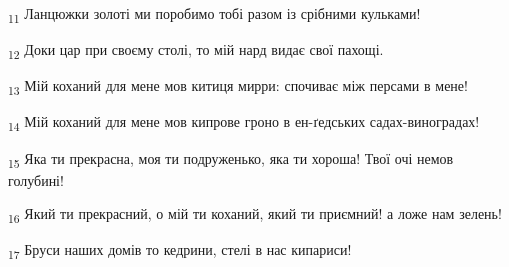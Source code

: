 \begin{tcolorbox}
\textsubscript{11} Ланцюжки золоті ми поробимо тобі разом із срібними кульками!
\end{tcolorbox}
\begin{tcolorbox}
\textsubscript{12} Доки цар при своєму столі, то мій нард видає свої пахощі.
\end{tcolorbox}
\begin{tcolorbox}
\textsubscript{13} Мій коханий для мене мов китиця мирри: спочиває між персами в мене!
\end{tcolorbox}
\begin{tcolorbox}
\textsubscript{14} Мій коханий для мене мов кипрове гроно в ен-ґедських садах-виноградах!
\end{tcolorbox}
\begin{tcolorbox}
\textsubscript{15} Яка ти прекрасна, моя ти подруженько, яка ти хороша! Твої очі немов голубині!
\end{tcolorbox}
\begin{tcolorbox}
\textsubscript{16} Який ти прекрасний, о мій ти коханий, який ти приємний! а ложе нам зелень!
\end{tcolorbox}
\begin{tcolorbox}
\textsubscript{17} Бруси наших домів то кедрини, стелі в нас кипариси!
\end{tcolorbox}
